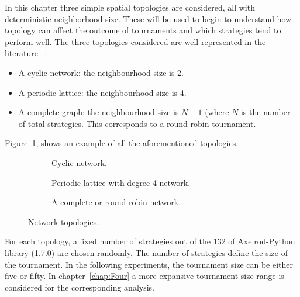 In this chapter three simple spatial topologies are considered, all with
deterministic neighborhood size. These will be used to begin to understand how
topology can affect the outcome of tournaments
and which strategies tend to perform well. The three topologies considered are
well represented in the literature~\cite{Axelrod1980a,Szabo2007,Lutz2013} :
\begin{itemize}
    \item A cyclic network: the neighbourhood size is 2. %
    \item A periodic lattice: the neighbourhood size is 4. %
    \item A complete graph: the neighbourhood size is \(N-1\) (where \(N\) is
        the number of total strategies. This corresponds to a round robin
        tournament. %
\end{itemize}

Figure~\ref{fig:networks}, shows an example of all the aforementioned topologies.

\begin{figure}[!hbtp]  %
\centering
    \begin{subfigure}[h]{0.45\textwidth}
    \centering
        
    \caption{Cyclic network.}
    \end{subfigure}
\hfill
    \begin{subfigure}[h]{0.52\textwidth}\centering
    \centering
        
    \caption{Periodic lattice with degree 4 network.}
    \end{subfigure}
\hfill
    \begin{subfigure}[h]{0.52\textwidth}\centering
    \centering
    
    \caption{A complete or round robin network.}
    \end{subfigure}
\caption{Network topologies.}
\label{fig:networks}
\end{figure}


For each topology, a fixed number of strategies out of the 132 of Axelrod-Python
library (1.7.0) are chosen randomly. The number of strategies define the size of the
tournament. In the following experiments, the tournament size can be either
five or fifty. In chapter~\ref{chap:Four} a more expansive tournament size range is
considered for the corresponding analysis.

